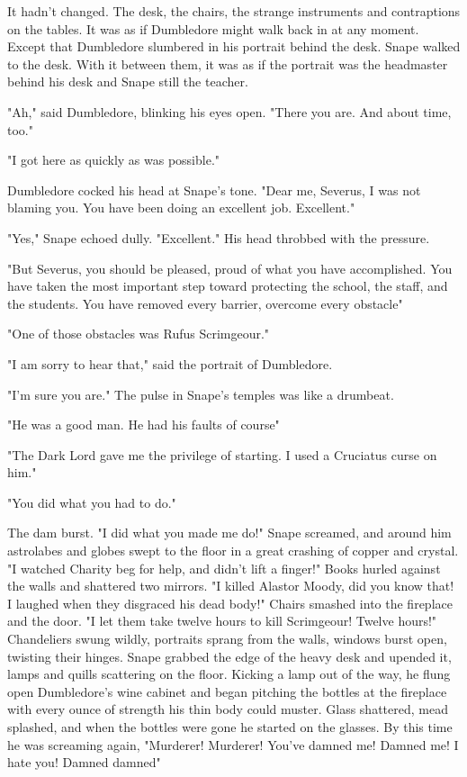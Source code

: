 It hadn't changed. The desk, the chairs, the strange instruments and contraptions on the tables. It was as if Dumbledore might walk back in at any moment. Except that Dumbledore slumbered in his portrait behind the desk. Snape walked to the desk. With it between them, it was as if the portrait was the headmaster behind his desk and Snape still the teacher.

"Ah," said Dumbledore, blinking his eyes open. "There you are. And about time, too."

"I got here as quickly as was possible."

Dumbledore cocked his head at Snape's tone. "Dear me, Severus, I was not blaming you. You have been doing an excellent job. Excellent."

"Yes," Snape echoed dully. "Excellent." His head throbbed with the pressure.

"But Severus, you should be pleased, proud of what you have accomplished. You have taken the most important step toward protecting the school, the staff, and the students. You have removed every barrier, overcome every obstacle{\el}"

"One of those obstacles was Rufus Scrimgeour."

"I am sorry to hear that," said the portrait of Dumbledore.

"I'm sure you are." The pulse in Snape's temples was like a drumbeat.

"He was a good man. He had his faults of course{\el}"

"The Dark Lord gave me the privilege of starting. I used a Cruciatus curse on him."

"You did what you had to do."

The dam burst. "I did what you made me do!" Snape screamed, and around him astrolabes and globes swept to the floor in a great crashing of copper and crystal. "I watched Charity beg for help, and didn't lift a finger!" Books hurled against the walls and shattered two mirrors. "I killed Alastor Moody, did you know that! I laughed when they disgraced his dead body!" Chairs smashed into the fireplace and the door. "I let them take twelve hours to kill Scrimgeour! Twelve hours!" Chandeliers swung wildly, portraits sprang from the walls, windows burst open, twisting their hinges. Snape grabbed the edge of the heavy desk and upended it, lamps and quills scattering on the floor. Kicking a lamp out of the way, he flung open Dumbledore's wine cabinet and began pitching the bottles at the fireplace with every ounce of strength his thin body could muster. Glass shattered, mead splashed, and when the bottles were gone he started on the glasses. By this time he was screaming again, "Murderer! Murderer! You've damned me! Damned me! I hate you! Damned{\el} damned{\el}"

